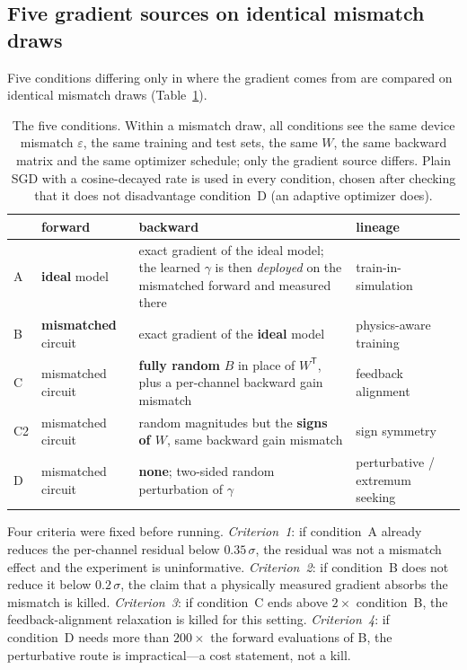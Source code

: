 \documentclass[11pt]{article}
\begin{document}
\subsection{Five gradient sources on identical mismatch draws}

Five conditions differing only in where the gradient comes from are compared on identical mismatch draws (Table~\ref{tab:trainconds}).

\begin{table}[h]
\centering
\caption{The five conditions. Within a mismatch draw, all conditions see the same device mismatch $\varepsilon$, the same training and test sets, the same $W$, the same backward matrix and the same optimizer schedule; only the gradient source differs. Plain SGD with a cosine-decayed rate is used in every condition, chosen after checking that it does not disadvantage condition~D (an adaptive optimizer does).}
\label{tab:trainconds}
\footnotesize
\begin{tabular}{p{1.1cm}p{3.6cm}p{6.2cm}p{4.0cm}}
\toprule
& forward & backward & lineage \\
\midrule
A & \textbf{ideal} model & exact gradient of the ideal model; the learned $\gamma$ is then \textit{deployed} on the mismatched forward and measured there & train-in-simulation \\
B & \textbf{mismatched} circuit & exact gradient of the \textbf{ideal} model & physics-aware training~\cite{wright2022} \\
C & mismatched circuit & \textbf{fully random} $B$ in place of $W^{\mathsf T}$, plus a per-channel backward gain mismatch & feedback alignment~\cite{lillicrap2016} \\
C2 & mismatched circuit & random magnitudes but the \textbf{signs of $W$}, same backward gain mismatch & sign symmetry~\cite{liao2016,xiao2018} \\
D & mismatched circuit & \textbf{none}; two-sided random perturbation of $\gamma$ & perturbative / extremum seeking~\cite{cauwenberghs1996,leblanc1922,krstic2000} \\
\bottomrule
\end{tabular}
\end{table}

Four criteria were fixed before running. \textit{Criterion~1}: if condition~A already reduces the per-channel residual below $0.35\,\sigma$, the residual was not a mismatch effect and the experiment is uninformative. \textit{Criterion~2}: if condition~B does not reduce it below $0.2\,\sigma$, the claim that a physically measured gradient absorbs the mismatch is killed. \textit{Criterion~3}: if condition~C ends above $2\times$ condition~B, the feedback-alignment relaxation is killed for this setting. \textit{Criterion~4}: if condition~D needs more than $200\times$ the forward evaluations of B, the perturbative route is impractical---a cost statement, not a kill.
\end{document}
